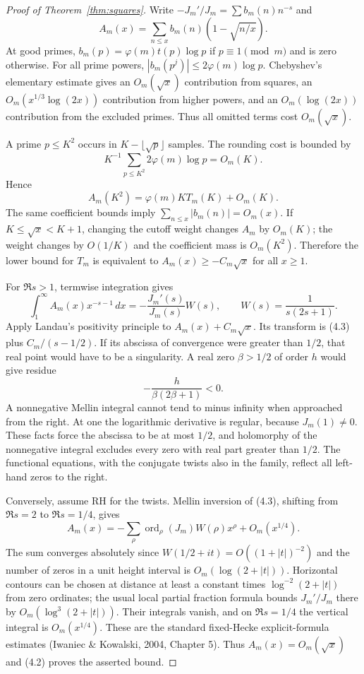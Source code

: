 \documentclass[11pt]{article}
\newcommand{\ord}{\operatorname{ord}}
\begin{document}
\begin{proof}[Proof of Theorem~\ref{thm:squares}]
Write $-J_m'/J_m=\sum b_m(n)n^{-s}$ and
\[
 A_m(x)=\sum_{n\le x}b_m(n)(1-\sqrt{n/x}).
\]
At good primes, $b_m(p)=\varphi(m)t(p)\log p$ if $p\equiv1\pmod m$ and is zero otherwise. For all prime powers, $|b_m(p^j)|\le2\varphi(m)\log p$. Chebyshev's elementary estimate gives an $O_m(\sqrt x)$ contribution from squares, an $O_m(x^{1/3}\log(2x))$ contribution from higher powers, and an $O_m(\log(2x))$ contribution from the excluded primes. Thus all omitted terms cost $O_m(\sqrt x)$.

A prime $p\le K^2$ occurs in $K-\lfloor\sqrt p\rfloor$ samples. The rounding cost is bounded by
\[
 K^{-1}\sum_{p\le K^2}2\varphi(m)\log p=O_m(K).
\]
Hence
\[
 A_m(K^2)=\varphi(m)K T_m(K)+O_m(K).
 \tag{4.2}
\]
The same coefficient bounds imply $\sum_{n\le x}|b_m(n)|=O_m(x)$. If $K\le\sqrt x<K+1$, changing the cutoff weight changes $A_m$ by $O_m(K)$; the weight changes by $O(1/K)$ and the coefficient mass is $O_m(K^2)$. Therefore the lower bound for $T_m$ is equivalent to $A_m(x)\ge-C_m\sqrt x$ for all $x\ge1$.

For $\Re s>1$, termwise integration gives
\[
 \int_1^\infty A_m(x)x^{-s-1}\,dx
   =-\frac{J_m'(s)}{J_m(s)}W(s),\qquad
 W(s)=\frac1{s(2s+1)}.
 \tag{4.3}
\]
Apply Landau's positivity principle to $A_m(x)+C_m\sqrt x$. Its transform is (4.3) plus $C_m/(s-1/2)$. If its abscissa of convergence were greater than $1/2$, that real point would have to be a singularity. A real zero $\beta>1/2$ of order $h$ would give residue
\[
                    -\frac{h}{\beta(2\beta+1)}<0.
 \tag{4.4}
\]
A nonnegative Mellin integral cannot tend to minus infinity when approached from the right. At one the logarithmic derivative is regular, because $J_m(1)\ne0$. These facts force the abscissa to be at most $1/2$, and holomorphy of the nonnegative integral excludes every zero with real part greater than $1/2$. The functional equations, with the conjugate twists also in the family, reflect all left-hand zeros to the right.

Conversely, assume RH for the twists. Mellin inversion of (4.3), shifting from $\Re s=2$ to $\Re s=1/4$, gives
\[
 A_m(x)=-\sum_\rho \ord_\rho(J_m)W(\rho)x^\rho+O_m(x^{1/4}).
 \tag{4.5}
\]
The sum converges absolutely since $W(1/2+it)=O((1+|t|)^{-2})$ and the number of zeros in a unit height interval is $O_m(\log(2+|t|))$. Horizontal contours can be chosen at distance at least a constant times $\log^{-2}(2+|t|)$ from zero ordinates; the usual local partial fraction formula bounds $J_m'/J_m$ there by $O_m(\log^3(2+|t|))$. Their integrals vanish, and on $\Re s=1/4$ the vertical integral is $O_m(x^{1/4})$. These are the standard fixed-Hecke explicit-formula estimates (Iwaniec \& Kowalski, 2004, Chapter 5). Thus $A_m(x)=O_m(\sqrt x)$ and (4.2) proves the asserted bound.
\end{proof}
\end{document}
